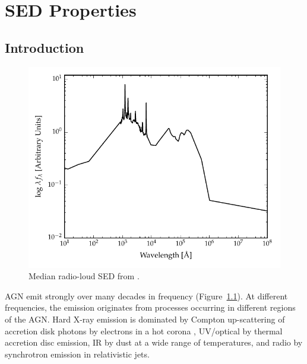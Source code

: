 
\chapter{SED Properties}
\label{ch:sed} 



\section{Introduction}

\begin{figure}
  \centering
  \includegraphics[width=\textwidth]{figures/chapter05/shangsed.pdf}
  \caption{Median radio-loud SED from \citet{shang11}.}
  \label{fig:seyfert_sed}
\end{figure}

AGN emit strongly over many decades in frequency (Figure~\ref{fig:seyfert_sed}). 
At different frequencies, the emission originates from processes occurring in different regions of the AGN. 
Hard X-ray emission is dominated by Compton up-scattering of accretion disk photons by electrons in a hot corona \citep[e.g.][]{sunyaev80}, UV/optical by thermal accretion disc emission, IR by dust at a wide range of temperatures, and radio by synchrotron emission in relativistic jets.   

